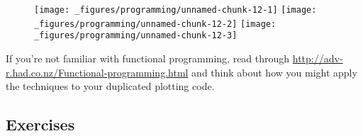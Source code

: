 \begin{Shaded}
\begin{Highlighting}[]
\StringTok{ }\NormalTok{(}
  \NormalTok{(),}
  \NormalTok{(}\NormalTok{(} \NormalTok{))),}
  \NormalTok{(}\NormalTok{(), }\NormalTok{())}
\NormalTok{)}

\StringTok{ }
\StringTok{ }
\CommentTok{#> [[1]]}
\CommentTok{#> }
\CommentTok{#> [[2]]}
\CommentTok{#> }
\CommentTok{#> [[3]]}
\end{Highlighting}
\end{Shaded}

\begin{figure}[H]
  \texttt{[image: \_figures/programming/unnamed-chunk-12-1]}%
  \texttt{[image: \_figures/programming/unnamed-chunk-12-2]}%
  \texttt{[image: \_figures/programming/unnamed-chunk-12-3]}
\end{figure}

If you're not familiar with functional programming, read through
\url{http://adv-r.had.co.nz/Functional-programming.html} and think about
how you might apply the techniques to your duplicated plotting code.

\subsection{Exercises}

